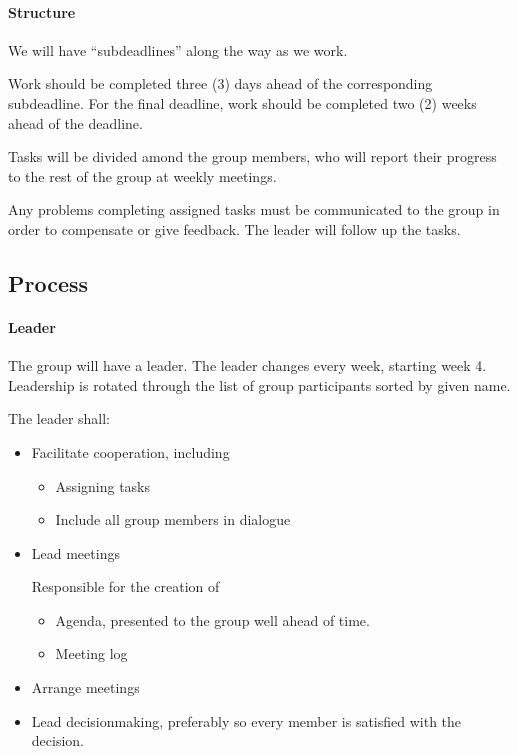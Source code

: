 \documentclass[a4paper, oneside, fleqn]{scrartcl}
\begin{document}
\paragraph{Structure}
We will have ``subdeadlines'' along the way as we work.

Work should be completed three (3) days ahead of the corresponding subdeadline. For the final deadline, work should be completed two (2) weeks ahead of the deadline.

Tasks will be divided amond the group members, who will report their progress to the rest of the group at weekly meetings.

Any problems completing assigned tasks must be communicated to the group in order to compensate or give feedback. The leader will follow up the tasks.

\subsection*{Process}
\paragraph{Leader}
The group will have a leader. The leader changes every week, starting week 4. Leadership is rotated through the list of group participants sorted by given name.

The leader shall:
\begin{itemize}
  \item Facilitate cooperation, including
  \begin{itemize}
    \item Assigning tasks
    \item Include all group members in dialogue
  \end{itemize}

  \item Lead meetings
  
  Responsible for the creation of
  \begin{itemize}
    \item Agenda, presented to the group well ahead of time.
    \item Meeting log
  \end{itemize}

  \item Arrange meetings
  \item Lead decisionmaking, preferably so every member is satisfied with the decision.
\end{itemize}
\end{document}

